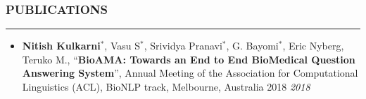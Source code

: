 \documentclass[10pt,a4paper,English]{article}
\newcommand\roottitle[1]{\vspace{-4mm}\subsubsection*{\uppercase{#1}}\vspace{-0.3em}\nopagebreak[4]\hrule\vspace{4mm}}
\newcommand\itemyear[1]{\hfill \emph{\color{itemyear} #1}}
\begin{document}
\roottitle{Publications}
\begin{itemize}[align=left, leftmargin=1em, itemindent=0mm, labelsep=0pt, labelwidth=1em]
    \vspace{-1.5mm}
    \item \textbf{Nitish Kulkarni}$^*$, Vasu S$^*$, Srividya Pranavi$^*$, G. Bayomi$^*$, Eric Nyberg, Teruko M., ``\textbf{BioAMA: Towards an End to End BioMedical Question Answering System}'', Annual Meeting of the Association for Computational Linguistics  (ACL), BioNLP track, Melbourne, Australia 2018 \itemyear{2018}
\end{itemize}
\end{document}
